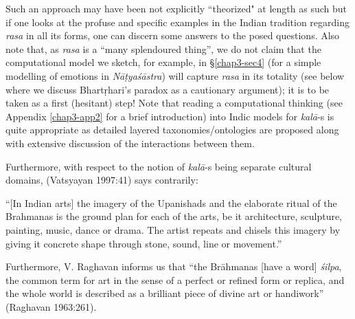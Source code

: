 Such an approach may have been not explicitly “theorized" at length as such but if one looks at the profuse and specific examples in the Indian tradition regarding \textsl{rasa} in all its forms, one can discern some answers to the posed questions. Also note that, as \textsl{rasa} is a “many splendoured thing”, we do not claim that the computational model we sketch, for example, in \S\ref{chap3-sec4} (for a simple modelling of emotions in \textsl{Nāṭyaśāstra}) will capture \textsl{rasa} in its totality (see below where we discuss Bhartṛhari’s paradox as a cautionary argument); it is to be taken as a first (hesitant) step! Note that reading a computational thinking (see Appendix \ref{chap3-app2} for a brief introduction) into Indic models for \textsl{kalā}-s is quite appropriate as detailed layered taxonomies/ontologies are proposed along with extensive discussion of the interactions between them.

Furthermore, with respect to the notion of \textsl{kalā}-s being separate cultural domains, (Vatsyayan
 1997:41) says contrarily:

\begin{myquote}
“[In Indian arts] the imagery of the Upanishads and the elaborate ritual of the Brahmanas is the ground plan for each of the arts, be it architecture, sculpture, painting, music, dance or drama. The artist repeats and chisels this imagery by giving it concrete shape through stone, sound, line or movement.”
\end{myquote}

Furthermore, V. Raghavan informs us that “the Brāhmanas [have a word] \textsl{śilpa}, the common term for art in the sense of a perfect or refined form or replica, and the whole world is described as a brilliant piece of divine art or handiwork” (Raghavan 1963:261).

